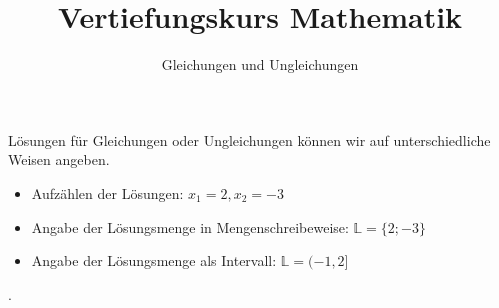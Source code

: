 \documentclass[11pt]{beamer}
\begin{document}
\title{Vertiefungskurs Mathematik}   
\author{Gleichungen und Ungleichungen} 
\date{}
\frame{\titlepage} 

\begin{frame}[fragile]

Lösungen für Gleichungen oder Ungleichungen können wir auf unterschiedliche Weisen angeben.
\begin{itemize}
\item Aufzählen der Lösungen:  $x_1 = 2, x_2 = -3$ \\
\item Angabe der Lösungsmenge in Mengenschreibeweise: $\mathbb{L} = \{2; -3\}$ \\
\item Angabe der Lösungsmenge als Intervall:  $\mathbb{L} =(-1, 2]$ 

\end{itemize}
.
\end{frame}
\end{document}
